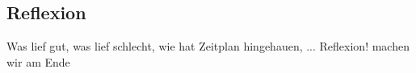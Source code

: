 \documentclass[main.tex]{subfiles} %
\begin{document}

\subsection{Reflexion}

Was lief gut, was lief schlecht, wie hat Zeitplan hingehauen, ... Reflexion! machen wir am Ende
\end{document}
